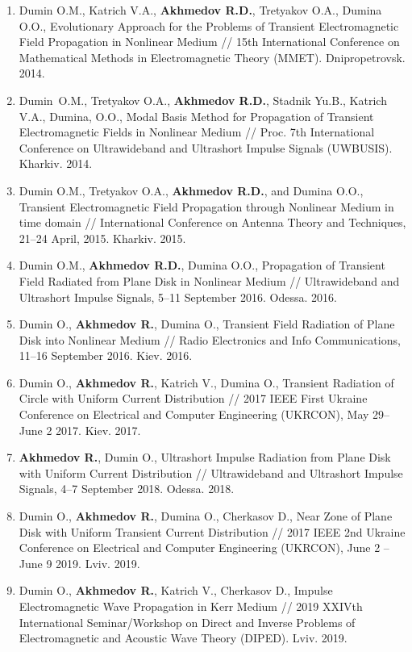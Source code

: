 \begin{enumerate}
\setcounter{enumi}{\value{ItemsInMyWriting}}

\item Dumin O.M., Katrich V.A., \textbf{Akhmedov R.D.}, Tretyakov O.A., 
Dumina O.O., Evolutionary Approach for the Problems of Transient 
Electromagnetic Field Propagation in Nonlinear Medium // 15th International 
Conference on Mathematical Methods in Electromagnetic Theory (MMET).
Dnipropetrovsk. 2014.

\item Dumin O.M., Tretyakov O.A., \textbf{Akhmedov R.D.}, Stadnik Yu.B., 
Katrich V.A., Dumina, O.O., Modal Basis Method for Propagation of 
Transient Electromagnetic Fields in Nonlinear Medium // Proc. 7th 
International Conference on Ultrawideband and Ultrashort Impulse Signals 
(UWBUSIS). Kharkiv. 2014.

\item Dumin O.M., Tretyakov O.A., \textbf{Akhmedov R.D.}, and Dumina O.O., 
Transient Electromagnetic Field Propagation through Nonlinear Medium in 
time domain // International Conference on Antenna Theory and Techniques, 
21--24 April, 2015. Kharkiv. 2015.

\item Dumin O.M., \textbf{Akhmedov R.D.}, Dumina O.O., Propagation of 
Transient Field Radiated from Plane Disk in Nonlinear Medium // 
Ultrawideband and Ultrashort Impulse Signals, 5--11 September 2016. 
Odessa. 2016.

\item Dumin O., \textbf{Akhmedov R.}, Dumina O., Transient Field 
Radiation of Plane Disk into Nonlinear Medium // Radio Electronics and 
Info Communications, 11--16 September 2016. Kiev. 2016.

\item Dumin O., \textbf{Akhmedov R.}, Katrich V., Dumina O., Transient 
Radiation of Circle with Uniform Current Distribution // 2017 IEEE First 
Ukraine Conference on Electrical and Computer Engineering (UKRCON), 
May 29--June 2 2017. Kiev. 2017.

\item \textbf{Akhmedov R.}, Dumin O., Ultrashort Impulse Radiation from 
Plane Disk with Uniform Current Distribution // Ultrawideband and 
Ultrashort Impulse Signals, 4--7 September 2018. Odessa. 2018.

\item Dumin O., \textbf{Akhmedov R.}, Dumina O., Cherkasov D., Near Zone 
of Plane Disk with Uniform Transient Current Distribution // 2017 IEEE 2nd 
Ukraine Conference on Electrical and Computer Engineering (UKRCON), 
June 2 -- June 9 2019. Lviv. 2019.

\item Dumin O., \textbf{Akhmedov R.}, Katrich V., Cherkasov D., 
Impulse Electromagnetic Wave Propagation in Kerr Medium // 2019 XXIVth 
International Seminar/Workshop on Direct and Inverse Problems of 
Electromagnetic and Acoustic Wave Theory (DIPED). Lviv. 2019.

\setcounter{ItemsInMyWriting}{\value{enumi}}
\end{enumerate}
